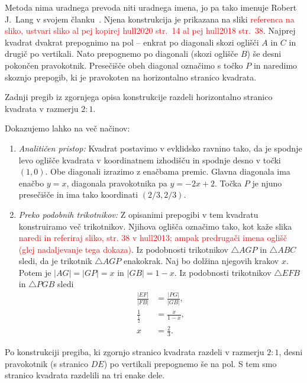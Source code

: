 Metoda nima uradnega prevoda niti uradnega imena, jo pa tako imenuje Robert J.\ Lang v svojem članku~\cite{lang1988}. Njena konstrukcija je prikazana na sliki \textcolor{red}{referenca na sliko, ustvari sliko al pej kopirej hull2020 str.\ 14 al pej hull2018 str.\ 38}. Najprej kvadrat dvakrat prepognimo na pol -- enkrat po diagonali skozi oglišči $A$ in $C$ in drugič po vertikali. Nato prepognemo po diagonali (skozi oglišče $B$) še desni pokončen pravokotnik. Presečišče obeh diagonal označimo s točko $P$ in naredimo skoznjo prepogib, ki je pravokoten na horizontalno stranico kvadrata.

\begin{trditev}
    \label{trd:kriz_diag_3}
    Zadnji pregib iz zgornjega opisa konstrukcije razdeli horizontalno stranico kvadrata v razmerju $2:1$.
\end{trditev}

\begin{dokaz}
    Dokazujemo lahko na več načinov:
    \begin{enumerate}
        \item \textit{Analitičen pristop:} Kvadrat postavimo v evklidsko ravnino tako, da je spodnje levo oglišče kvadrata v koordinatnem izhodišču in spodnje desno v točki $(1, 0)$. Obe diagonali izrazimo z enačbama premic. Glavna diagonala ima enačbo $y = x$, diagonala pravokotnika pa $y = -2x + 2$. Točka $P$ je njuno presečišče in ima tako koordinati $(2/3, 2/3)$.
        \item \textit{Preko podobnih trikotnikov:} Z opisanimi prepogibi v tem kvadratu konstruiramo več trikotnikov. Njihova oglišča označimo tako, kot kaže slika \textcolor{red}{naredi in referiraj sliko, str. 38 v hull2013; ampak predrugači imena oglišč (glej nadaljevanje tega dokaza)}. Iz podobnosti trikotnikov $\triangle AGP$ in $\triangle ABC$ sledi, da je trikotnik $\triangle AGP$ enakokrak. Naj bo dolžina njegovih krakov $x$. Potem je $|AG| = |GP| = x$ in $|GB| = 1 - x$. Iz podobnosti trikotnikov $\triangle EFB$ in $\triangle PGB$ sledi
        \begin{align*}
            \frac{|EF|}{|FB|} &= \frac{|PG|}{|GB|}, \\
            \frac{1}{\frac{1}{2}} &= \frac{x}{1 - x}, \\
            x &= \frac{2}{3}.
        \end{align*}
    \end{enumerate}
\end{dokaz}

Po konstrukciji pregiba, ki zgornjo stranico kvadrata razdeli v razmerju $2:1$, desni pravokotnik (s stranico $DE$) po vertikali prepognemo še na pol. S tem smo stranico kvadrata razdelili na tri enake dele.


